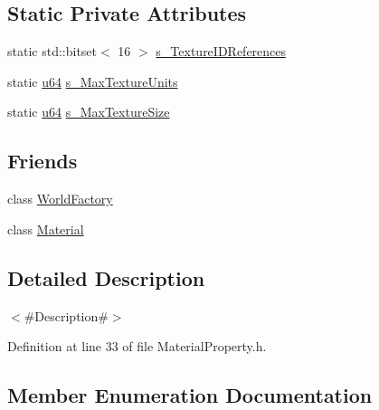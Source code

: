 \subsection*{Static Private Attributes}
\begin{DoxyCompactItemize}
\item 
static std\+::bitset$<$ 16 $>$ \mbox{\hyperlink{classnjli_1_1_material_property_a6cc6f82863c4a24f7ce7fd987d79621d}{s\+\_\+\+Texture\+I\+D\+References}}
\item 
static \mbox{\hyperlink{_util_8h_ad758b7a5c3f18ed79d2fcd23d9f16357}{u64}} \mbox{\hyperlink{classnjli_1_1_material_property_a2171d36a9f88b3a13ae5076d4260bd35}{s\+\_\+\+Max\+Texture\+Units}}
\item 
static \mbox{\hyperlink{_util_8h_ad758b7a5c3f18ed79d2fcd23d9f16357}{u64}} \mbox{\hyperlink{classnjli_1_1_material_property_a4a448748254555524066ca2806a6b66d}{s\+\_\+\+Max\+Texture\+Size}}
\end{DoxyCompactItemize}
\subsection*{Friends}
\begin{DoxyCompactItemize}
\item 
class \mbox{\hyperlink{classnjli_1_1_material_property_acb96ebb09abe8f2a37a915a842babfac}{World\+Factory}}
\item 
class \mbox{\hyperlink{classnjli_1_1_material_property_aa1212b6e372a0f45d2c01f3cd203af77}{Material}}
\end{DoxyCompactItemize}


\subsection{Detailed Description}
$<$\#\+Description\#$>$ 

Definition at line 33 of file Material\+Property.\+h.



\subsection{Member Enumeration Documentation}
\mbox{\label{classnjli_1_1_material_property_ae02b26fdb8ff7968cc6def931e69855b}} 
